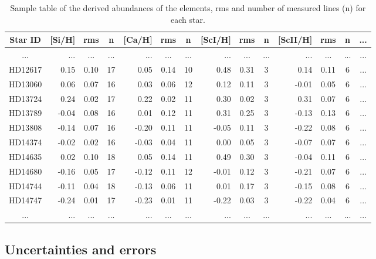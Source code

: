 \documentclass[oldversion]{aa}
\newcommand\T{\rule{0pt}{2.6ex}}
\newcommand\B{\rule[-1.2ex]{0pt}{0pt}}
\begin{document}
\begin{table}[t] %
\centering
\caption[Sample table of the abundance derived for the studied elements]{Sample table of the derived abundances of the elements, rms and number of measured lines (n) for each star.}
  \label{table:abundances}
 
 \begin{tabular}{ c | r c c | r c c | r c c | r c c c }
 
  \hline
  \hline
Star ID \T & [Si/H] & rms & n & [Ca/H] & rms & n & [ScI/H] & rms & n & [ScII/H] & rms & n & ... \B \\
\hline
... & ... & ... & ... & ... & ... & ... & ... & ... & ... & ... & ... & ... & ...\\
HD12617 &  0.15 & 0.10 & 17 &  0.05 & 0.14 & 10 &  0.48 & 0.31 &  3 &  0.14 & 0.11 &  6 & ...\\
HD13060 &  0.06 & 0.07 & 16 &  0.03 & 0.06 & 12 &  0.12 & 0.11 &  3 & -0.01 & 0.05 &  6 & ...\\
HD13724 &  0.24 & 0.02 & 17 &  0.22 & 0.02 & 11 &  0.30 & 0.02 &  3 &  0.31 & 0.07 &  6 & ...\\
HD13789 & -0.04 & 0.08 & 16 &  0.01 & 0.12 & 11 &  0.31 & 0.25 &  3 & -0.13 & 0.13 &  6 & ...\\
HD13808 & -0.14 & 0.07 & 16 & -0.20 & 0.11 & 11 & -0.05 & 0.11 &  3 & -0.22 & 0.08 &  6 & ...\\
HD14374 & -0.02 & 0.02 & 16 & -0.03 & 0.04 & 11 &  0.00 & 0.05 &  3 & -0.07 & 0.07 &  6 & ...\\
HD14635 &  0.02 & 0.10 & 18 &  0.05 & 0.14 & 11 &  0.49 & 0.30 &  3 & -0.04 & 0.11 &  6 & ...\\
HD14680 & -0.16 & 0.05 & 17 & -0.12 & 0.11 & 12 & -0.01 & 0.12 &  3 & -0.21 & 0.07 &  6 & ...\\
HD14744 & -0.11 & 0.04 & 18 & -0.13 & 0.06 & 11 &  0.01 & 0.17 &  3 & -0.15 & 0.08 &  6 & ...\\
HD14747 & -0.24 & 0.01 & 17 & -0.23 & 0.01 & 11 & -0.22 & 0.03 &  3 & -0.22 & 0.04 &  6 & ...\\
... & ... & ... & ... & ... & ... & ... & ... & ... & ... & ... & ... & ... & ...\\
\hline

\end{tabular}

\end{table}


\subsection{Uncertainties and errors}
\label{sec:errors}
\end{document}
